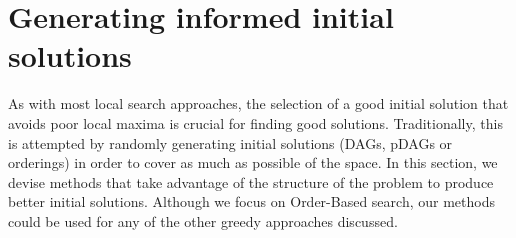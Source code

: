 \section{Generating informed initial solutions}
\label{sec:improve}

As with most local search approaches, the selection of a good initial
solution that avoids poor local maxima is crucial for finding good
solutions. Traditionally, this is attempted by randomly generating
initial solutions (DAGs, pDAGs or orderings) in order to cover as much
as possible of the space. In this section, we devise methods that take
advantage of the structure of the problem to produce better initial
solutions. Although we focus on Order-Based search, our methods could be
used for any of the other greedy approaches discussed.



